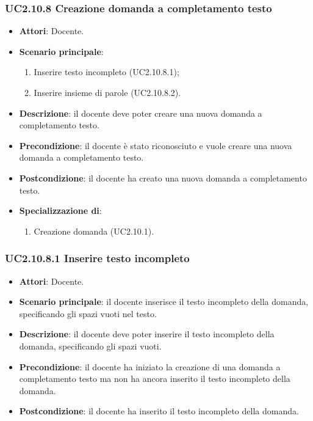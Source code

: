 \subsubsection{UC2.10.8 Creazione domanda a completamento testo}
\begin{itemize}
\item \textbf{Attori}: Docente.
\item \textbf{Scenario principale}:
\begin{enumerate}
\item Inserire testo incompleto (UC2.10.8.1);
\item Inserire insieme di parole (UC2.10.8.2).
\end{enumerate}
\item \textbf{Descrizione}: il docente deve poter creare una nuova domanda a completamento testo.
\item \textbf{Precondizione}: il docente è stato riconosciuto e vuole creare una nuova domanda a completamento testo.
\item \textbf{Postcondizione}: il docente ha creato una nuova domanda a completamento testo.
\item \textbf{Specializzazione di}:
\begin{enumerate}
\item Creazione domanda (UC2.10.1).
\end{enumerate}
\end{itemize}
\subsubsection{UC2.10.8.1 Inserire testo incompleto}
\begin{itemize}
\item \textbf{Attori}: Docente.
\item \textbf{Scenario principale}: il docente inserisce il testo incompleto della domanda, specificando gli spazi vuoti nel testo.
\item \textbf{Descrizione}: il docente deve poter inserire il testo incompleto della domanda, specificando gli spazi vuoti.
\item \textbf{Precondizione}: il docente ha iniziato la creazione di una domanda a completamento testo ma non ha ancora inserito il testo incompleto della domanda.
\item \textbf{Postcondizione}: il docente ha inserito il testo incompleto della domanda.
\end{itemize}
